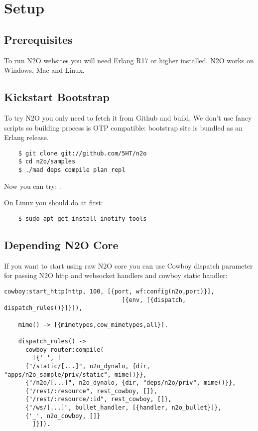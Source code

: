 \section{Setup}

\subsection{Prerequisites}
To run N2O websites you will need Erlang R17 or higher installed.
N2O works on Windows, Mac and Linux.

\subsection{Kickstart Bootstrap}
To try N2O you only need to fetch it from Github and build. We don't use
fancy scripts so building process is OTP compatible: bootstrap site
is bundled as an Erlang release.

\vspace{1\baselineskip}
\begin{lstlisting}
    $ git clone git://github.com/5HT/n2o
    $ cd n2o/samples
    $ ./mad deps compile plan repl
\end{lstlisting}
\vspace{1\baselineskip}

Now you can try: .

On Linux you should do at first:

\begin{lstlisting}
    $ sudo apt-get install inotify-tools
\end{lstlisting}

\newpage
\subsection{Depending N2O Core}
If you want to start using raw N2O core you can use Cowboy dispatch parameter
for passing N2O http and websocket handlers and cowboy static handler:

\begin{lstlisting}[caption=web\_sup.erl]
    cowboy:start_http(http, 100, [{port, wf:config(n2o,port)}],
                                 [{env, [{dispatch, dispatch_rules()}]}]),

    mime() -> [{mimetypes,cow_mimetypes,all}].

    dispatch_rules() ->
      cowboy_router:compile(
        [{'_', [
      {"/static/[...]", n2o_dynalo, {dir, "apps/n2o_sample/priv/static", mime()}},
      {"/n2o/[...]", n2o_dynalo, {dir, "deps/n2o/priv", mime()}},
      {"/rest/:resource", rest_cowboy, []},
      {"/rest/:resource/:id", rest_cowboy, []},
      {"/ws/[...]", bullet_handler, [{handler, n2o_bullet}]},
      {'_', n2o_cowboy, []}
        ]}]).
\end{lstlisting}

